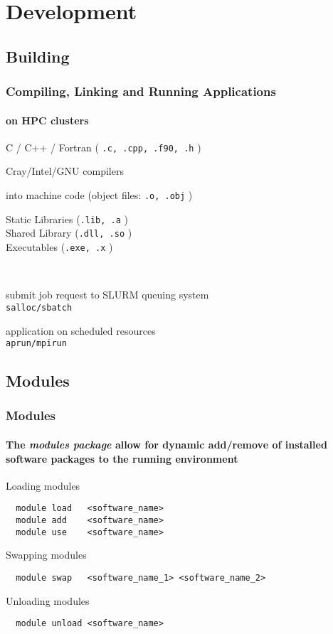 \section{Development}
\subsection{Building}
\begin{frame}[fragile]
\frametitle{Compiling, Linking and Running Applications}
\framesubtitle{on HPC clusters}
 \begin{description}
    \item [source code] C / C++ / Fortran ( \verb|.c, .cpp, .f90, .h|  )
    \item [compile] Cray/Intel/GNU compilers
    \item [assemble] into machine code (object files: \verb|.o, .obj| )
    \item [link] Static Libraries (\verb|.lib, .a|  ) \\ Shared Library (\verb|.dll, .so| ) \\ Executables (\verb|.exe, .x| )
    \item ~ 
    \item [request allocation] submit job request to SLURM queuing system \\ \verb|salloc/sbatch|
    \item [run] application on scheduled resources \\ \verb|aprun/mpirun|
 \end{description}
\end{frame}

\subsection{Modules}
\begin{frame}[fragile]
\frametitle{Modules}
\framesubtitle{The \textit{modules package} allow for dynamic add/remove of installed software packages to the running environment}

\begin{exampleblock}{Loading modules}
  \begin{verbatim}
  module load 	<software_name>
  module add 	<software_name>
  module use 	<software_name>
  \end{verbatim}
\end{exampleblock}

\begin{exampleblock}{Swapping modules}
  \begin{verbatim}
  module swap 	<software_name_1> <software_name_2>
  \end{verbatim}
\end{exampleblock}

\begin{exampleblock}{Unloading modules}
  \begin{verbatim}
  module unload <software_name>
  \end{verbatim}
\end{exampleblock}
\end{frame}


